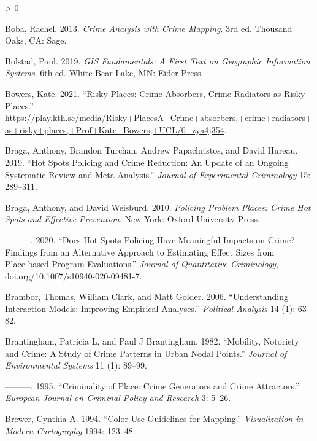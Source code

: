 \documentclass[
  krantz2]{krantz}
\newlength{\cslhangindent}
\newenvironment{CSLReferences}[2] %
 {%
  \setlength{\parindent}{0pt}
  \ifodd #1 \everypar{\setlength{\hangindent}{\cslhangindent}}\ignorespaces\fi
  \ifnum #2 > 0
  \setlength{\parskip}{#2\baselineskip}
  \fi
 }%
 {}
\begin{document}
\begin{CSLReferences}{1}{0}
\leavevmode\hypertarget{ref-Boba_2013}{}%
Boba, Rachel. 2013. \emph{Crime Analysis with Crime Mapping}. 3rd ed. Thousand Oaks, CA: Sage.

\leavevmode\hypertarget{ref-Bolstad_2019}{}%
Bolstad, Paul. 2019. \emph{GIS Fundamentals: A First Text on Geographic Information Systems}. 6th ed. White Bear Lake, MN: Eider Press.

\leavevmode\hypertarget{ref-Bowers_2021}{}%
Bowers, Kate. 2021. {``Risky Places: Crime Absorbers, Crime Radiators as Risky Places.''} \url{https://play.kth.se/media/Risky+PlacesA+Crime+absorbers,+crime+radiators+as+risky+places,+Prof+Kate+Bowers,+UCL/0_zya4j354}.

\leavevmode\hypertarget{ref-Braga_2019}{}%
Braga, Anthony, Brandon Turchan, Andrew Papachristos, and David Hureau. 2019. {``Hot Spots Policing and Crime Reduction: An Update of an Ongoing Systematic Review and Meta-Analysis.''} \emph{Journal of Experimental Criminology} 15: 289--311.

\leavevmode\hypertarget{ref-Braga_2010}{}%
Braga, Anthony, and David Weisburd. 2010. \emph{Policing Problem Places: Crime Hot Spots and Effective Prevention}. New York: Oxford University Press.

\leavevmode\hypertarget{ref-Braga_2020}{}%
---------. 2020. {``Does Hot Spots Policing Have Meaningful Impacts on Crime? Findings from an Alternative Approach to Estimating Effect Sizes from Place‑based Program Evaluations.''} \emph{Journal of Quantitative Criminology}, doi.org/10.1007/s10940-020-09481-7.

\leavevmode\hypertarget{ref-Brambor_2006}{}%
Brambor, Thomas, William Clark, and Matt Golder. 2006. {``Understanding Interaction Models: Improving Empirical Analyses.''} \emph{Political Analysis} 14 (1): 63--82.

\leavevmode\hypertarget{ref-Brantingham_1982}{}%
Brantingham, Patricia L, and Paul J Brantingham. 1982. {``Mobility, Notoriety and Crime: A Study of Crime Patterns in Urban Nodal Points.''} \emph{Journal of Environmental Systems} 11 (1): 89--99.

\leavevmode\hypertarget{ref-Brantingham_1995}{}%
---------. 1995. {``Criminality of Place: Crime Generators and Crime Attractors.''} \emph{European Journal on Criminal Policy and Research} 3: 5--26.

\leavevmode\hypertarget{ref-Brewer_1994}{}%
Brewer, Cynthia A. 1994. {``Color Use Guidelines for Mapping.''} \emph{Visualization in Modern Cartography} 1994: 123--48.


\end{CSLReferences}
\end{document}
